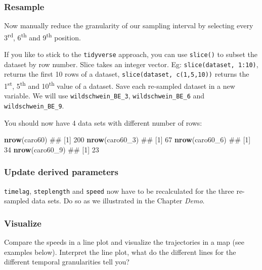 \documentclass[]{book}
\newenvironment{Shaded}{\begin{snugshade}}{\end{snugshade}}
\newcommand{\KeywordTok}[1]{\textcolor[rgb]{0.13,0.29,0.53}{\textbf{#1}}}
\newcommand{\DecValTok}[1]{\textcolor[rgb]{0.00,0.00,0.81}{#1}}
\newcommand{\NormalTok}[1]{#1}
\begin{document}
\subsubsection{Resample}\label{resample}

Now manually reduce the granularity of our sampling interval by
selecting every 3\textsuperscript{rd}, 6\textsuperscript{th} and
9\textsuperscript{th} position.

If you like to stick to the \texttt{tidyverse} approach, you can use
\texttt{slice()} to subset the dataset by row number. Slice takes an
integer vector. Eg: \texttt{slice(dataset,\ 1:10)}, returns the first 10
rows of a dataset, \texttt{slice(dataset,\ c(1,5,10))} returns the
1\textsuperscript{st}, 5\textsuperscript{th} and 10\textsuperscript{th}
value of a dataset. Save each re-sampled dataset in a new variable. We
will use \texttt{wildschwein\_BE\_3}, \texttt{wildschwein\_BE\_6} and
\texttt{wildschwein\_BE\_9}.

You should now have 4 data sets with different number of rows:

\begin{Shaded}
\begin{Highlighting}[]
\KeywordTok{nrow}\NormalTok{(caro60)}
\NormalTok{## [1] 200}
\KeywordTok{nrow}\NormalTok{(caro60_}\DecValTok{3}\NormalTok{)}
\NormalTok{## [1] 67}
\KeywordTok{nrow}\NormalTok{(caro60_}\DecValTok{6}\NormalTok{)}
\NormalTok{## [1] 34}
\KeywordTok{nrow}\NormalTok{(caro60_}\DecValTok{9}\NormalTok{)}
\NormalTok{## [1] 23}
\end{Highlighting}
\end{Shaded}

\subsubsection{Update derived
parameters}\label{update-derived-parameters}

\texttt{timelag}, \texttt{steplength} and \texttt{speed} now have to be
recalculated for the three re-sampled data sets. Do so as we illustrated
in the Chapter \emph{Demo}.

\subsubsection{Visualize}\label{visualize}

Compare the speeds in a line plot and visualize the trajectories in a
map (see examples below). Interpret the line plot, what do the different
lines for the different temporal granularities tell you?
\end{document}
